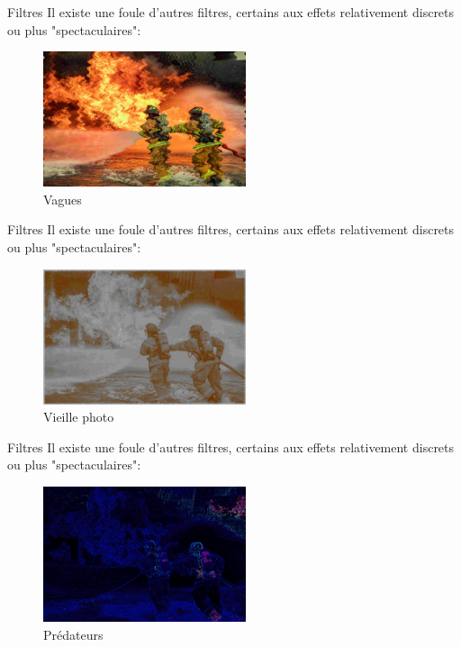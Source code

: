 \documentclass[10pt,svgnames,usenames,table]{beamer}
\begin{document}
\begin{frame}{Filtres}
		Il existe une foule d'autres filtres, certains aux effets relativement discrets ou plus "spectaculaires":
		
		\begin{figure}[H]
			\centering
				\includegraphics[height=150px]{Images/filters/ripples} 
				\caption{Vagues}
\end{figure}		
	\end{frame}

\begin{frame}{Filtres}
		Il existe une foule d'autres filtres, certains aux effets relativement discrets ou plus "spectaculaires":
		
		\begin{figure}[H]
			\centering
				\includegraphics[height=150px]{Images/filters/old} 
				\caption{Vieille photo}
\end{figure}		
	\end{frame}

\begin{frame}{Filtres}
		Il existe une foule d'autres filtres, certains aux effets relativement discrets ou plus "spectaculaires":
		
		\begin{figure}[H]
			\centering
				\includegraphics[height=150px]{Images/filters/predator} 
				\caption{Prédateurs}
\end{figure}		
	\end{frame}
\end{document}
